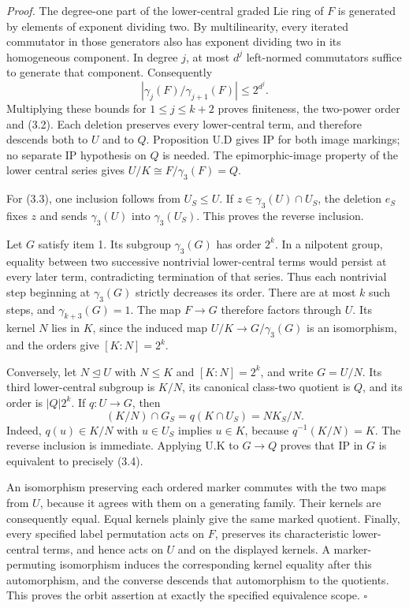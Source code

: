 \documentclass[
  11pt,
  a4paper,
]{article}
\begin{document}
\emph{Proof.} The degree-one part of the lower-central graded Lie ring
of \(F\) is generated by elements of exponent dividing two. By
multilinearity, every iterated commutator in those generators also has
exponent dividing two in its homogeneous component. In degree \(j\), at
most \(d^j\) left-normed commutators suffice to generate that component.
Consequently \[
|\gamma_j(F)/\gamma_{j+1}(F)|\leq2^{d^j}.
\] Multiplying these bounds for \(1\leq j\leq k+2\) proves finiteness,
the two-power order and (3.2). Each deletion preserves every
lower-central term, and therefore descends both to \(U\) and to \(Q\).
Proposition U.D gives IP for both image markings; no separate IP
hypothesis on \(Q\) is needed. The epimorphic-image property of the
lower central series gives \(U/K\cong F/\gamma_3(F)=Q\).

For (3.3), one inclusion follows from \(U_S\leq U\). If
\(z\in\gamma_3(U)\cap U_S\), the deletion \(e_S\) fixes \(z\) and sends
\(\gamma_3(U)\) into \(\gamma_3(U_S)\). This proves the reverse
inclusion.

Let \(G\) satisfy item 1. Its subgroup \(\gamma_3(G)\) has order
\(2^k\). In a nilpotent group, equality between two successive
nontrivial lower-central terms would persist at every later term,
contradicting termination of that series. Thus each nontrivial step
beginning at \(\gamma_3(G)\) strictly decreases its order. There are at
most \(k\) such steps, and \(\gamma_{k+3}(G)=1\). The map \(F\to G\)
therefore factors through \(U\). Its kernel \(N\) lies in \(K\), since
the induced map \(U/K\to G/\gamma_3(G)\) is an isomorphism, and the
orders give \([K:N]=2^k\).

Conversely, let \(N\unlhd U\) with \(N\leq K\) and \([K:N]=2^k\), and
write \(G=U/N\). Its third lower-central subgroup is \(K/N\), its
canonical class-two quotient is \(Q\), and its order is \(|Q|2^k\). If
\(q:U\to G\), then \[
(K/N)\cap G_S=q(K\cap U_S)=NK_S/N.
\tag{3.5}
\] Indeed, \(q(u)\in K/N\) with \(u\in U_S\) implies \(u\in K\), because
\(q^{-1}(K/N)=K\). The reverse inclusion is immediate. Applying U.K to
\(G\to Q\) proves that IP in \(G\) is equivalent to precisely (3.4).

An isomorphism preserving each ordered marker commutes with the two maps
from \(U\), because it agrees with them on a generating family. Their
kernels are consequently equal. Equal kernels plainly give the same
marked quotient. Finally, every specified label permutation acts on
\(F\), preserves its characteristic lower-central terms, and hence acts
on \(U\) and on the displayed kernels. A marker-permuting isomorphism
induces the corresponding kernel equality after this automorphism, and
the converse descends that automorphism to the quotients. This proves
the orbit assertion at exactly the specified equivalence scope.
\(\square\)
\end{document}
